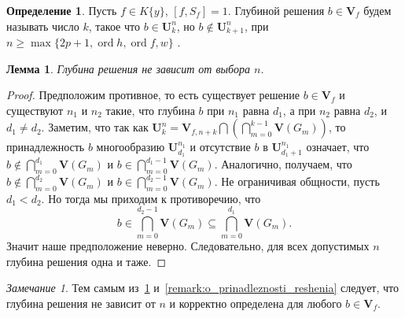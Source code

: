 \documentclass[16pt]{article}
\DeclareMathOperator{\ord}{ord}
\theoremstyle{plain1}
\newtheorem{lemma}[theorem1]{Лемма}
\theoremstyle{plain2}
\theoremstyle{plain}
\theoremstyle{plain3}
\theoremstyle{definition}
\newtheorem{definition}[theorem2]{Определение}
\theoremstyle{remark}
\newtheorem*{remark*}{Замечание}
\begin{document}
\begin{definition}
Пусть $f\in K\{y\}$, $[f,S_f]=1$.  Глубиной решения $b\in \mathbf{V}_f$  будем называть число $k$, такое что $b\in \mathbf{U}_k^n$, но $b\not\in \mathbf{U}_{k+1}^n$, при $n \geqslant\max\{ 2p+1,\ord{h},\ord{f},w\}$ .
\end{definition}



\begin{lemma}\label{lemma:o_nasledovanii}
Глубина решения не зависит от выбора $n$.

\end{lemma}

\begin{proof}
Предположим противное, то есть существует решение $b\in\mathbf{V}_f$ и существуют $n_1$ и $n_2$ такие, что  глубина $b$ при $n_1$  равна $d_1$, а при $n_2$ равна $d_2$, и $d_1\not=d_2$. Заметим, что так как $\mathbf{U}_k^n=\mathbf{V}_{f,n+k}\bigcap\left(\bigcap\limits_{m=0}^{k-1}\mathbf{V}\left(G_m\right)\right)$, то принадлежность $b$  многообразию $\mathbf{U}_{d_1}^{n_1}$ и отсутствие $b$ в $\mathbf{U}_{d_1+1}^{n_1}$ означает, что $b\not\in\bigcap\limits_{m=0}^{d_1}\mathbf{V}\left(G_m\right)$ и $b\in\bigcap\limits_{m=0}^{d_1-1}\mathbf{V}\left(G_m\right)$. Аналогично, получаем, что $b\not\in\bigcap\limits_{m=0}^{d_2}\mathbf{V}\left(G_m\right)$ и $b\in\bigcap\limits_{m=0}^{d_2-1}\mathbf{V}\left(G_m\right)$. Не ограничивая общности, пусть $d_1<d_2$. Но тогда мы приходим к противоречию, что 
$$
b\in\bigcap\limits_{m=0}^{d_2-1}\mathbf{V}\left(G_m\right)\subseteq\bigcap\limits_{m=0}^{d_1}\mathbf{V}\left(G_m\right).
$$
Значит наше предположение неверно. Следовательно, для всех  допустимых $n$ глубина решения одна и таже.

\end{proof}

\begin{remark*}\label{remark:o_sushestvovanii_gllubiny} Тем самым из~\ref{lemma:o_nasledovanii} и~\ref{remark:o_prinadleznosti_reshenia} следует, что глубина решения не зависит от $n$ и корректно определена для любого $b\in \mathbf{V}_f$.
\end{remark*}
\end{document}
